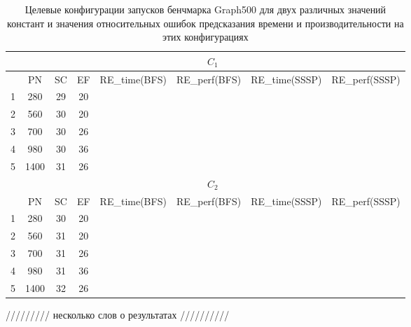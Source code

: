 		\begin{table}
			\begin{tabular}{|r||c|c|c|c|c|c|c|}
				\hline
				            & \multicolumn{7}{c|}{\(C_1\)}                                                     \\ \hline
				\textnumero & PN   & SC & EF & RE\_time(BFS) & RE\_perf(BFS) & RE\_time(SSSP) & RE\_perf(SSSP) \\ \hline
				1           & 280  & 29 & 20 &               &               &                &                \\ \hline
				2           & 560  & 30 & 20 &               &               &                &                \\ \hline  
				3           & 700  & 30 & 26 &               &               &                &                \\ \hline
				4           & 980  & 30 & 36 &               &               &                &                \\ \hline
				5           & 1400 & 31 & 26 &               &               &                &                \\ \hhline{|=||=|=|=|=|=|=|=|}
				            & \multicolumn{7}{c|}{\(C_2\)} \\ \hline
				            & PN   & SC & EF & RE\_time(BFS) & RE\_perf(BFS) & RE\_time(SSSP) & RE\_perf(SSSP) \\ \hline
				1           & 280  & 30 & 20 &               &               &                &                \\ \hline
				2           & 560  & 31 & 20 &               &               &                &                \\ \hline
				3           & 700  & 31 & 26 &               &               &                &                \\ \hline
				4           & 980  & 31 & 36 &               &               &                &                \\ \hline
				5           & 1400 & 32 & 26 &               &               &                &                \\ \hline               
			\end{tabular}
			\caption{Целевые конфигурации запусков бенчмарка Graph500 для двух различных значений констант и значения относительных ошибок предсказания времени и производительности на этих конфигурациях}
			\label{targer_Graph500}
		\end{table}

		///////// несколько слов о результатах //////////
\clearpage
